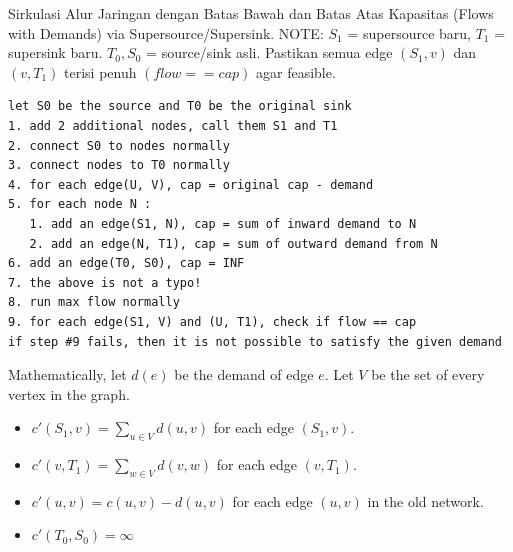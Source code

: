Sirkulasi Alur Jaringan dengan Batas Bawah dan Batas Atas Kapasitas (Flows with Demands) via Supersource/Supersink. \newline
NOTE: $S_1$ = supersource baru, $T_1$ = supersink baru. $T_0,S_0$ = source/sink asli.  
Pastikan semua edge $(S_1,v)$ dan $(v,T_1)$ terisi penuh $(flow == cap)$ agar feasible. \newline
\begin{lstlisting}
let S0 be the source and T0 be the original sink
1. add 2 additional nodes, call them S1 and T1
2. connect S0 to nodes normally
3. connect nodes to T0 normally
4. for each edge(U, V), cap = original cap - demand
5. for each node N :
   1. add an edge(S1, N), cap = sum of inward demand to N
   2. add an edge(N, T1), cap = sum of outward demand from N
6. add an edge(T0, S0), cap = INF
7. the above is not a typo!
8. run max flow normally
9. for each edge(S1, V) and (U, T1), check if flow == cap
if step #9 fails, then it is not possible to satisfy the given demand
\end{lstlisting}
\par\noindent Mathematically, let $d(e)$ be the demand of edge $e$. Let $V$ be the set of every vertex in the graph.
\begin{itemize}
    \item $c'(S_1,v) = \sum_{u\in{V}} d(u,v)$ for each edge $(S_1,v)$.
    \item $c'(v,T_1) = \sum_{w\in{V}} d(v,w)$ for each edge $(v,T_1)$.
    \item $c'(u,v) = c(u,v) - d(u,v)$ for each edge $(u,v)$ in the old network.
    \item $c'(T_0,S_0) = \infty$
\end{itemize}
